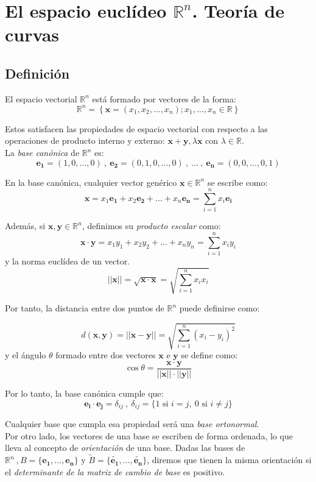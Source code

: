\chapter{El espacio euclídeo $\mathbb{R}^n$. Teoría de curvas}
\section{Definición}
\large
El espacio vectorial $\mathbb{R}^n$ está formado por vectores de la forma:
$$
\mathbb{R}^n=\left \{ \mathbf{x}=(x_1,x_2,...,x_n);x_1,...,x_n\in \mathbb{R}\right \}
$$

Estos satisfacen las propiedades de espacio vectorial con respecto a las operaciones de producto interno y externo: $\mathbf{x+y},\lambda \mathbf{x}$ con $\lambda \in \mathbb{R}$.\\

La \emph{base canónica} de $\mathbb{R}^n$ es:
$$
\mathbf{e_1}=(1,0,...,0) \ , \ \mathbf{e_2}=(0,1,0,...,0) \ , \ ... \ , \ \mathbf{e_n}=(0,0,...,0,1)
$$

En la base canónica, cualquier vector genérico $\mathbf{x}\in \mathbb{R}^n$ se escribe como:
$$
\mathbf{x}=x_1\mathbf{e_1}+x_2\mathbf{e_2}+...+x_n\mathbf{e_n}=\sum_{i=1}^n x_i \mathbf{e_i}
$$

Además, si $\mathbf{x,y} \in \mathbb{R}^n$, definimos su \emph{producto escalar} como: 
$$
\mathbf{x\cdot y}=x_1y_1+x_2y_2+...+x_ny_n=\sum_{i=1}^n x_iy_i
$$
y la norma euclídea de un vector.
$$
||\mathbf{x}||=\sqrt{\mathbf{x\cdot x}}=\sqrt{\sum_{i=1}^n x_ix_i}
$$

Por tanto, la distancia entre dos puntos de $\mathbb{R}^n$ puede definirse como:

$$
d(\mathbf{x,y})=||\mathbf{x}-\mathbf{y}||=\sqrt{\sum_{i=1}^n(x_i-y_i)^2}
$$
y el ángulo $\theta$ formado entre dos vectores $\mathbf{x}$ e $\mathbf{y}$ se define como:
$$
\cos{\theta}=\frac{\mathbf{x\cdot y}}{||\mathbf{x}||\cdot||\mathbf{y}||}
$$

Por lo tanto, la base canónica cumple que:
$$
\boxed{\mathbf{e_i\cdot e_j}=\delta_{ij}} \ , \ \delta_{ij}=\{ 1 \text{ si } i=j,\ 0 \text{ si } i\neq j\}
$$

Cualquier base que cumpla esa propiedad será una \emph{base ortonormal}. \\

Por otro lado, los vectores de una base se escriben de forma ordenada, lo que lleva al concepto de \emph{orientación} de una base. Dadas las bases de $\mathbb{R}^n\ ,B=\{ \mathbf{e_1},...,\mathbf{e_n}\}$ y $\tilde{B}=\{ \tilde{\mathbf{e_1}},...,\tilde{\mathbf{e_n}}\}$, diremos que tienen la misma orientación si el \emph{determinante de la matriz de cambio de base} es positivo.\\

